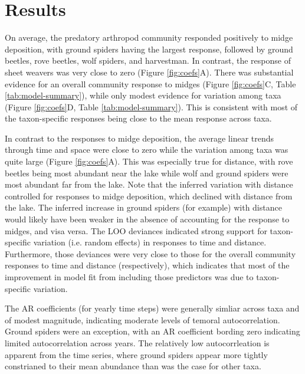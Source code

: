 

\section*{Results}

On average, the predatory arthropod community responded positively to midge deposition,
with ground spiders having the largest response,
followed by ground beetles, rove beetles, wolf spiders, and harvestman.
In contrast, the response of sheet weavers was very close to zero
(Figure \ref{fig:coefs}A).
There was substantial evidence for an overall community response to midges
(Figure \ref{fig:coefs}C, Table \ref{tab:model-summary}),
while only modest evidence for variation among taxa
(Figure \ref{fig:coefs}D, Table \ref{tab:model-summary}). This is consistent with
most of the taxon-specific responses being close to the mean response across taxa.

In contrast to the responses to midge deposition, the average linear trends through
time and space were close to zero
while the variation among taxa was quite large
(Figure \ref{fig:coefs}A).
This was especially true for distance, with rove beetles being most abundant near
the lake while wolf and ground spiders were most abundant far from the lake.
Note that the inferred variation with distance controlled for responses to midge
deposition, which declined with distance from the lake.
The inferred increase in ground spiders (for example) with distance
would likely have been weaker in the absence of accounting for the response to midges,
and visa versa.
The LOO deviances indicated strong support for taxon-specific variation
(i.e. random effects) in responses to time and distance.
Furthermore, those deviances were very close to those for the overall community
responses to time and distance (respectively), which indicates that most of the
improvement in model fit from including those predictors was due to taxon-specific
variation.

The AR coefficients (for yearly time steps) were generally simliar across taxa
and of modest magnitude, indicating moderate levels of temoral autocorrelation.
Ground spiders were an exception,
with an AR coefficient bording zero indicating limited autocorrelation across years.
The relatively low autocorrleation is apparent from the time series,
where ground spiders appear more tightly constrianed to their mean abundance
than was the case for other taxa.

